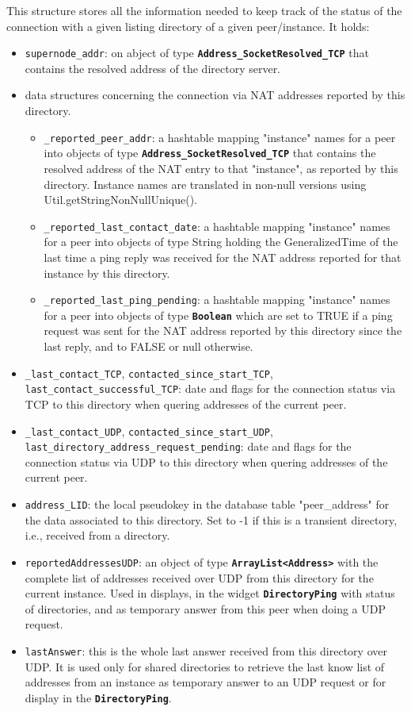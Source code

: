 \documentclass{book}
\newcommand{\cls}[1]{{\tt\bf #1}}
\newcommand{\mmb}[1]{{\tt #1}}
\begin{document}
This structure stores all the information needed to keep track of the status of the connection with a given listing directory of a given
peer/instance. It holds:
\begin{itemize}
\item
\mmb{supernode\_addr}: on abject of type \cls{Address\_SocketResolved\_TCP} that contains the resolved address of the directory server.
\item data structures concerning the connection via NAT addresses reported by this directory.
 \begin{itemize}
 \item
 \mmb{\_reported\_peer\_addr}: a hashtable mapping "instance" names for a peer into objects of type \cls{Address\_SocketResolved\_TCP} that contains the resolved address of the NAT entry to that "instance", as reported by this directory. Instance names are translated in non-null
versions using Util.getStringNonNullUnique().
 \item
 \mmb{\_reported\_last\_contact\_date}: a hashtable mapping "instance" names for a peer into objects of type String holding the GeneralizedTime of the last time a ping reply was received for the NAT address reported for that instance by this directory.
 \item
 \mmb{\_reported\_last\_ping\_pending}: a hashtable mapping "instance" names for a peer into objects of type \cls{Boolean} which are
set to TRUE if a ping request was sent for the NAT address reported by this directory since the last reply, and to FALSE or null otherwise.
 \end{itemize}
\item
\mmb{\_last\_contact\_TCP}, \mmb{contacted\_since\_start\_TCP}, \mmb{last\_contact\_successful\_TCP}: date and flags for the connection
status via TCP to this directory when quering addresses of the current peer.
\item
\mmb{\_last\_contact\_UDP}, \mmb{contacted\_since\_start\_UDP}, \mmb{last\_directory\_address\_request\_pending}: date and flags for the connection
status via UDP to this directory when quering addresses of the current peer.
\item
\mmb{address\_LID}: the local pseudokey in the database table "peer\_address" for the data associated to this directory. Set to -1
if this is a transient directory, i.e., received from a directory.
\item
\mmb{reportedAddressesUDP}: an object of type \cls{ArrayList<Address>} with the complete list of addresses received over UDP from
this directory for the current instance. Used in displays, in the widget \cls{DirectoryPing} with status of directories,
and as temporary answer from this peer when doing a UDP request.
%
\item
\mmb{lastAnswer}: this is the whole last answer received from this directory over UDP. It is used only for shared directories to retrieve
the last know list of addresses from an instance as temporary answer to an UDP request or for display in the \cls{DirectoryPing}.
\end{itemize}
\end{document}

